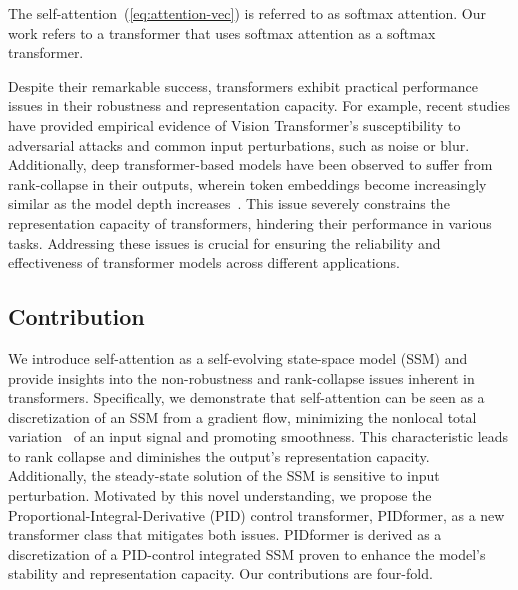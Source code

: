 The self-attention~(\ref{eq:attention-vec}) is referred to as softmax attention. Our work refers to a transformer that uses softmax attention as a softmax transformer.

Despite their remarkable success, transformers exhibit practical performance issues in their robustness and representation capacity. For example, recent studies \cite{mahmood2021robustness,madry2017towards,zhou2022understanding} have provided empirical evidence of Vision Transformer's susceptibility to adversarial attacks and common input perturbations, such as noise or blur. Additionally, deep transformer-based models have been observed to suffer from rank-collapse in their outputs, wherein token embeddings become increasingly similar as the model depth increases~\cite{shi2022revisiting, dong2021attention,wang2022antioversmoothing}. This issue severely constrains the representation capacity of transformers, hindering their performance in various tasks. Addressing these issues is crucial for ensuring the reliability and effectiveness of transformer models across different applications.

\vspace{-2mm}
\subsection{Contribution}

We introduce self-attention as a self-evolving state-space model (SSM) and provide insights into the non-robustness and rank-collapse issues inherent in transformers. Specifically, we demonstrate that self-attention can be seen as a discretization of an SSM from a gradient flow, minimizing the nonlocal total variation~\cite{Gilboa2008NonlocalOW} of an input signal and promoting smoothness. This characteristic leads to rank collapse and diminishes the output's representation capacity. Additionally, the steady-state solution of the SSM is sensitive to input perturbation. Motivated by this novel understanding, we propose the Proportional-Integral-Derivative (PID) control transformer, PIDformer, as a new transformer class that mitigates both issues. PIDformer is derived as a discretization of a PID-control integrated SSM proven to enhance the model's stability and representation capacity. Our contributions are four-fold.

